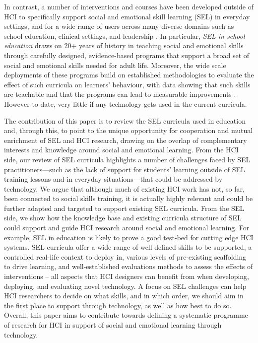 \documentclass[prodmode,acmtochi]{acmsmall}
\begin{document}
In contrast, a number of interventions and courses have been developed outside of HCI to specifically support social and emotional skill learning (SEL) in everyday settings, and for a wide range of users across many diverse domains such as school education, clinical settings, and leadership \cite{Greenberg2010,Stepien2006,Barth2011,Carey2011,Bono2009}. In particular, \emph{SEL in school education} draws on 20+ years of history in teaching social and emotional skills through carefully designed, evidence-based programs that support a broad set of social and emotional skills needed for adult life. Moreover, the wide scale deployments of these programs build on established methodologies to evaluate the effect of such curricula on learners' behaviour, with data showing that such skills are teachable and that the programs can lead to measurable improvements \cite{Durlak2011,Weare2011}. However to date, very little if any technology gets used in the current curricula. 

The contribution of this paper is to review the SEL curricula used in education and, through this, to point to the unique opportunity for cooperation and mutual enrichment of SEL and HCI research, drawing on the overlap of complementary interests and knowledge around social and emotional learning. 
%
From the HCI side, our review of SEL curricula highlights a number of challenges faced by SEL practitioners---such as the lack of support for students' learning outside of SEL training lessons and in everyday situations---that could be addressed by technology. We argue that although much of existing HCI work has not, so far, been connected to social skills training, it is actually highly relevant and could be further adapted and targeted to support existing SEL curricula.  %
%
From the SEL side, we show how the knowledge base and existing curricula structure of SEL could support and guide HCI research around social and emotional learning. For example, SEL in education is likely to prove a good test-bed for cutting edge HCI systems. SEL curricula offer a wide range of well defined skills to be supported, a controlled real-life context to deploy in, various levels of pre-existing scaffolding to drive learning, and well-established evaluations methods to assess the effects of interventions -- all aspects that HCI designers can benefit from when developing, deploying, and evaluating novel technology. A focus on SEL challenges can help HCI researchers to decide on what skills, and in which order, we should aim in the first place to support through technology, as well as how best to do so. 
%
Overall, this paper aims to contribute towards defining a systematic programme of research for HCI in support of social and emotional learning through technology. 
\end{document}
